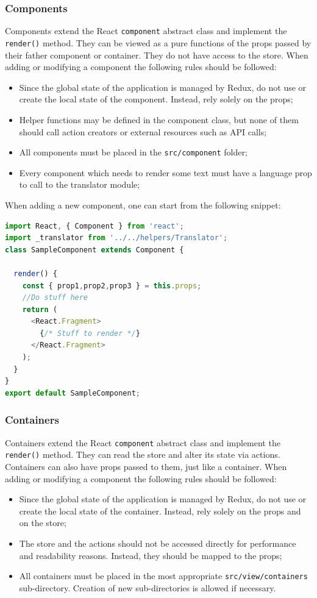 \subsubsection{Components}
Components extend the React \texttt{component} abstract class and implement the \texttt{render()} method. They can be viewed as a pure functions of the props passed by their father component or container. They do not have access to the store. When adding or modifying a component the following rules should be followed:
\begin{itemize}
	\item Since the global state of the application is managed by Redux, do not use or create the local state of the component. Instead, rely solely on the props;
	\item Helper functions may be defined in the component class, but none of them should call action creators or external resources such as API calls;
	\item All components must be placed in the \texttt{src/component} folder;
	\item Every component which needs to render some text must have a language prop to call to the translator module;
\end{itemize}
When adding a new component, one can start from the following snippet:
\begin{lstlisting}[language=JavaScript, frame=single]
import React, { Component } from 'react';
import _translator from '../../helpers/Translator';
class SampleComponent extends Component {

  render() {
    const { prop1,prop2,prop3 } = this.props;
    //Do stuff here
    return (
      <React.Fragment>
        {/* Stuff to render */}
      </React.Fragment>
    );
  }
}
export default SampleComponent;
\end{lstlisting}


\subsubsection{Containers}
Containers extend the React \texttt{component} abstract class and implement the \texttt{render()} method. They can read the store and alter its state via actions. Containers can also have props passed to them, just like a container. When adding or modifying a component the following rules should be followed:
\begin{itemize}
	\item Since the global state of the application is managed by Redux, do not use or create the local state of the container. Instead, rely solely on the props and on the store;
	\item The store and the actions should not be accessed directly for performance and readability reasons. Instead, they should be mapped to the props;
	\item All containers must be placed in the most appropriate \texttt{src/view/containers} sub-directory. Creation of new sub-directories is allowed if necessary.
\end{itemize}

